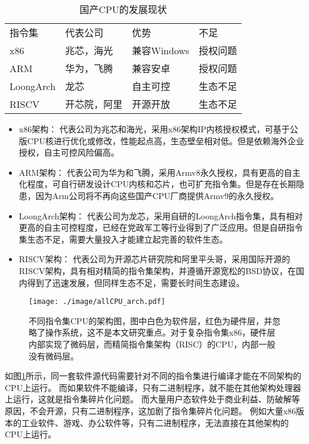 \begin{table}[]
\centering
\caption{国产CPU的发展现状}
\label{tab:CPUs}
    \begin{tabular}{llll}
    \rowcolor[HTML]{FBE5D6} 
    指令集       & 代表公司   & 优势        & 不足         \\
    x86       & 兆芯，海光  & 兼容Windows & 授权问题 \\
    ARM       & 华为，飞腾  & 兼容安卓      & 授权问题       \\
    LoongArch & 龙芯     & 自主可控      & 生态不足       \\
    RISCV     & 开芯院，阿里 & 开源开放      & 生态不足      
    \end{tabular}
    \end{table}


    \begin{itemize}
    \item {x86架构： } 代表公司为兆芯和海光，采用x86架构IP内核授权模式，可基于公版CPU核进行优化或修改，性能起点高，生态壁垒相对低。但是依赖海外企业授权，自主可控风险偏高。
    
    \item{ARM架构：} 代表公司为华为和飞腾，采用Armv8永久授权，具有更高的自主化程度，可自行研发设计CPU内核和芯片，也可扩充指令集。但是存在长期隐患，因为Arm公司将不再向这些国产CPU厂商提供Armv9的永久授权。
    
    \item{LoongArch架构：} 代表公司为龙芯，采用自研的LoongArch指令集，具有相对更高的自主可控程度，已经在党政军工等行业得到了广泛应用。但是自研指令集生态不足，需要大量投入才能建立起完善的软件生态。
    
    \item{RISCV架构：} 代表公司为开源芯片研究院和阿里平头哥，采用国际开源的RISCV架构，具有相对精简的指令集架构，并遵循开源宽松的BSD协议，在国内得到了迅速发展，但同样生态不足，需要长时间生态建设。
    \end{itemize}


\begin{figure}[!htbp]
    \centering
    \texttt{[image: ./image/allCPU\_arch.pdf]}
    \caption{不同指令集CPU的架构图，图中白色为软件层，红色为硬件层，并忽略了操作系统，这不是本文研究重点。对于复杂指令集x86，硬件层内部实现了微码层，而精简指令集架构（RISC）的CPU，内部一般没有微码层。}
    \label{img:allCPU_arch}
  \end{figure}


如图\ref{img:allCPU_arch}所示，同一套软件源代码需要针对不同的指令集进行编译才能在不同架构的CPU上运行\footnotemark。
而如果软件不能编译，只有二进制程序，就不能在其他架构处理器上运行，这就是指令集碎片化问题。
而大量用户态软件处于商业利益、防破解等原因，不会开源，只有二进制程序，这加剧了指令集碎片化问题。
例如大量x86版本的工业软件、游戏、办公软件等，只有二进制程序，无法直接在其他架构的CPU上运行。

